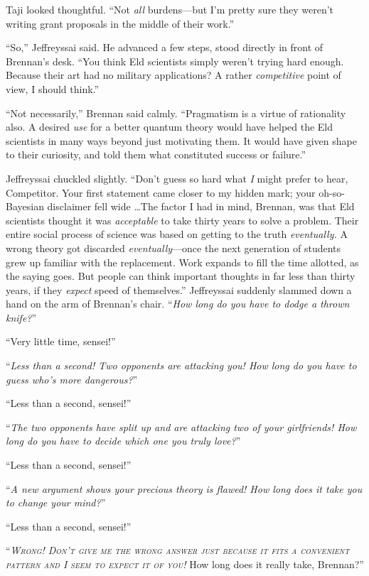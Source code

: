 {
 Taji looked thoughtful. ``Not \textit{all}
burdens---but I'm pretty sure they
weren't writing grant proposals in the middle of their
work.''}

{
 ``So,'' Jeffreyssai said. He
advanced a few steps, stood directly in front of
Brennan's desk. ``You think Eld
scientists simply weren't trying hard enough. Because
their art had no military applications? A rather \textit{competitive}
point of view, I should think.''}

{
 ``Not necessarily,'' Brennan
said calmly. ``Pragmatism is a virtue of rationality
also. A desired \textit{use} for a better quantum theory would have
helped the Eld scientists in many ways beyond just motivating them. It
would have given shape to their curiosity, and told them what
constituted success or failure.''}

{
 Jeffreyssai chuckled slightly.
``Don't guess so hard what \textit{I}
might prefer to hear, Competitor. Your first statement came closer to
my hidden mark; your oh-so-Bayesian disclaimer fell wide \ldots The
factor I had in mind, Brennan, was that Eld scientists thought it was
\textit{acceptable} to take thirty years to solve a problem. Their
entire social process of science was based on getting to the truth
\textit{eventually.} A wrong theory got discarded
\textit{eventually}{}---once the next generation of students grew up
familiar with the replacement. Work expands to fill the time allotted,
as the saying goes. But people can think important thoughts in far less
than thirty years, if they \textit{expect} speed of
themselves.'' Jeffreyssai suddenly slammed down a
hand on the arm of Brennan's chair.
``\textit{How long do you have to dodge a thrown
knife?}''}

{
 ``Very little time, sensei!''}

{
 ``\textit{Less than a second! Two opponents are
attacking you! How long do you have to guess who's more
dangerous?}''}

{
 ``Less than a second,
sensei!''}

{
 ``\textit{The two opponents have split up and are
attacking two of your girlfriends! How long do you have to decide which
one you truly love?}''}

{
 ``Less than a second,
sensei!''}

{
 ``\textit{A new argument shows your precious
theory is flawed! How long does it take you to change your
mind?}''}

{
 ``Less than a second,
sensei!''}

{
 ``\textit{\textsc{Wrong! Don't give me
the wrong answer just because it fits a convenient pattern and I seem
to expect it of you!}} How long does it really take,
Brennan?''}

